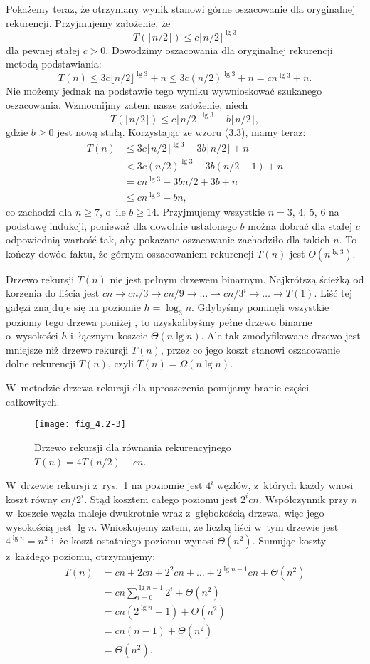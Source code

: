 Pokażemy teraz, że otrzymany wynik stanowi górne oszacowanie dla oryginalnej rekurencji.
Przyjmujemy założenie, że
\[
    T(\lfloor n/2\rfloor)\le c\lfloor n/2\rfloor^{\lg3}
\]
dla pewnej stałej $c>0$.
Dowodzimy oszacowania dla oryginalnej rekurencji metodą podstawiania:
\[
	T(n) \le 3c\lfloor n/2\rfloor^{\lg3}+n \le 3c(n/2)^{\lg3}+n = cn^{\lg3}+n.
\]
Nie możemy jednak na podstawie tego wyniku wywnioskować szukanego oszacowania.
Wzmocnijmy zatem nasze założenie, niech
\[
	T(\lfloor n/2\rfloor) \le c\lfloor n/2\rfloor^{\lg3}-b\lfloor n/2\rfloor,
\]
gdzie $b\ge0$ jest nową stałą.
Korzystając ze wzoru (3.3), mamy teraz:
\begin{align*}
	T(n) &\le 3c\lfloor n/2\rfloor^{\lg3}-3b\lfloor n/2\rfloor+n \\
	&< 3c(n/2)^{\lg3}-3b(n/2-1)+n \\
	&= cn^{\lg3}-3bn/2+3b+n \\
	&\le cn^{\lg3}-bn,
\end{align*}
co zachodzi dla $n\ge7$, o~ile $b\ge14$.
Przyjmujemy wszystkie $n=3$, 4, 5, 6 na podstawę indukcji, ponieważ dla dowolnie ustalonego $b$ można dobrać dla stałej $c$ odpowiednią wartość tak, aby pokazane oszacowanie zachodziło dla takich $n$.
To kończy dowód faktu, że górnym oszacowaniem rekurencji $T(n)$ jest $O(n^{\lg3})$.

\exercise %
Drzewo rekursji $T(n)$ nie jest pełnym drzewem binarnym.
Najkrótszą ścieżką od korzenia do liścia jest $cn\to cn/3\to cn/9\to\dots\to cn/3^i\to\dots\to T(1)$.
Liść tej gałęzi znajduje się na poziomie $h=\log_3n$.
Gdybyśmy pominęli wszystkie poziomy tego drzewa poniżej , to uzyskalibyśmy pełne drzewo binarne o~wysokości $h$ i~łącznym koszcie $\Theta(n\lg n)$.
Ale tak zmodyfikowane drzewo jest mniejsze niż drzewo rekursji $T(n)$, przez co jego koszt stanowi oszacowanie dolne rekurencji $T(n)$, czyli $T(n)=\Omega(n\lg n)$.

\exercise %
W~metodzie drzewa rekursji dla uproszczenia pomijamy branie części całkowitych.
\begin{figure}[ht]
	\begin{center}
		\texttt{[image: fig\_4.2-3]}
	\end{center}
	\caption{Drzewo rekursji dla równania rekurencyjnego $T(n)=4T(n/2)+cn$.} \label{fig:4.2-3}
\end{figure}
W~drzewie rekursji z~rys.\ \ref{fig:4.2-3} na  poziomie jest $4^i$ węzłów, z~których każdy wnosi koszt równy $cn/2^i$.
Stąd kosztem całego poziomu jest $2^icn$.
Współczynnik przy $n$ w~koszcie węzła maleje dwukrotnie wraz z~głębokością drzewa, więc jego wysokością jest $\lg n$.
Wnioskujemy zatem, że liczbą liści w~tym drzewie jest $4^{\lg n}=n^2$ i~że koszt ostatniego poziomu wynosi $\Theta(n^2)$.
Sumując koszty z~każdego poziomu, otrzymujemy:
\begin{align*}
	T(n) &= cn+2cn+2^2cn+\dots+2^{\lg n-1}cn+\Theta(n^2) \\
	&= cn\sum_{i=0}^{\lg n-1}2^i+\Theta(n^2) \\
	&= cn(2^{\lg n}-1)+\Theta(n^2) \\
	&= cn(n-1)+\Theta(n^2) \\
	&= \Theta(n^2).
\end{align*}

